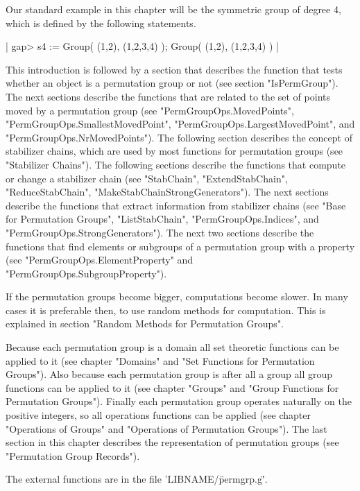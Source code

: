 Our  standard example  in this chapter will  be  the symmetric  group  of
degree 4, which is defined by the following {\GAP} statements.

|    gap> s4 := Group( (1,2), (1,2,3,4) );
    Group( (1,2), (1,2,3,4) ) |

This introduction  is followed by  a section that describes the  function
that tests whether an object  is a permutation group or  not (see section
"IsPermGroup").  The  next  sections  describe  the  functions  that  are
related  to  the  set  of  points  moved  by  a  permutation  group  (see
"PermGroupOps.MovedPoints",            "PermGroupOps.SmallestMovedPoint",
"PermGroupOps.LargestMovedPoint", and "PermGroupOps.NrMovedPoints").  The
following section  describes the concept of stabilizer chains, which  are
used by most functions for permutation groups (see "Stabilizer  Chains").
The following sections describe  the  functions that compute or  change a
stabilizer     chain     (see     "StabChain",     "ExtendStabChain",
"ReduceStabChain",  "MakeStabChainStrongGenerators").  The  next sections
describe the  functions that  extract information from  stabilizer chains
(see     "Base      for     Permutation     Groups",     "ListStabChain",
"PermGroupOps.Indices", and  "PermGroupOps.StrongGenerators").  The  next
two sections describe the functions that  find elements or subgroups of a
permutation group with a property (see "PermGroupOps.ElementProperty" and
"PermGroupOps.SubgroupProperty").

If the permutation groups become bigger, computations become slower. In many
cases it is preferable then, to use random methods for computation.
This is explained in section "Random Methods for Permutation Groups".

Because each permutation group  is a domain all  set theoretic  functions
can  be  applied  to it  (see  chapter "Domains"  and "Set Functions  for
Permutation Groups").  Also because each permutation group is after all a
group all group functions can be applied to  it (see chapter "Groups" and
"Group  Functions for  Permutation  Groups").  Finally  each  permutation
group operates  naturally  on  the positive integers,  so all  operations
functions  can  be  applied  (see  chapter  "Operations  of  Groups"  and
"Operations of  Permutation  Groups").  The last  section in this chapter
describes the representation  of  permutation  groups  (see  "Permutation
Group Records").

The external functions are in the file 'LIBNAME/\"permgrp.g\"'.

